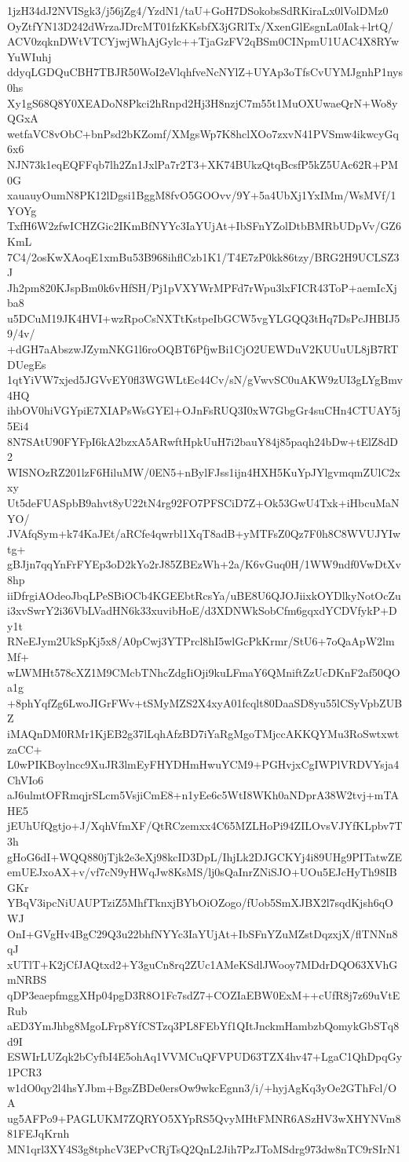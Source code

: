 1jzH34dJ2NVISgk3/j56jZg4/YzdN1/taU+GoH7DSokobsSdRKiraLx0lVolDMz0
OyZtfYN13D242dWrzaJDrcMT01fzKKsbfX3jGRlTx/XxenGlEsgnLa0Iak+lrtQ/
ACV0zqknDWtVTCYjwjWhAjGylc++TjaGzFV2qBSm0CINpmU1UAC4X8RYwYuWIuhj
ddyqLGDQuCBH7TBJR50WoI2eVlqhfveNcNYlZ+UYAp3oTfsCvUYMJgnhP1nys0hs
Xy1gS68Q8Y0XEADoN8Pkci2hRnpd2Hj3H8nzjC7m55t1MuOXUwaeQrN+Wo8yQGxA
wetfaVC8vObC+bnPsd2bKZomf/XMgsWp7K8hclXOo7zxvN41PVSmw4ikwcyGq6x6
NJN73k1eqEQFFqb7lh2Zn1JxlPa7r2T3+XK74BUkzQtqBcsfP5kZ5UAc62R+PM0G
xauauyOumN8PK12lDgsi1BggM8fvO5GOOvv/9Y+5a4UbXj1YxIMm/WsMVf/1YOYg
TxfH6W2zfwICHZGic2IKmBfNYYc3IaYUjAt+IbSFnYZolDtbBMRbUDpVv/GZ6KmL
7C4/2osKwXAoqE1xmBu53B968ihflCzb1K1/T4E7zP0kk86tzy/BRG2H9UCLSZ3J
Jh2pm820KJspBm0k6vHfSH/Pj1pVXYWrMPFd7rWpu3lxFICR43ToP+aemIcXjba8
u5DCuM19JK4HVI+wzRpoCsNXTtKstpeIbGCW5vgYLGQQ3tHq7DsPcJHBIJ59/4v/
+dGH7aAbszwJZymNKG1l6roOQBT6PfjwBi1CjO2UEWDuV2KUUuUL8jB7RTDUegEs
1qtYiVW7xjed5JGVvEY0fl3WGWLtEc44Cv/sN/gVwvSC0uAKW9zUI3gLYgBmv4HQ
ihbOV0hiVGYpiE7XIAPsWsGYEl+OJnFsRUQ3I0xW7GbgGr4suCHn4CTUAY5j5Ei4
8N7SAtU90FYFpI6kA2bzxA5ARwftHpkUuH7i2bauY84j85paqh24bDw+tElZ8dD2
WISNOzRZ201lzF6HiluMW/0EN5+nBylFJss1ijn4HXH5KuYpJYlgvmqmZUlC2xxy
Ut5deFUASpbB9ahvt8yU22tN4rg92FO7PFSCiD7Z+Ok53GwU4Txk+iHbcuMaNYO/
JVAfqSym+k74KaJEt/aRCfe4qwrbl1XqT8adB+yMTFsZ0Qz7F0h8C8WVUJYIwtg+
gBJjn7qqYnFrFYEp3oD2kYo2rJ85ZBEzWh+2a/K6vGuq0H/1WW9ndf0VwDtXv8hp
iiDfrgiAOdeoJbqLPeSBiOCb4KGEEbtRcsYa/uBE8U6QJOJiixkOYDlkyNotOcZu
i3xvSwrY2i36VbLVadHN6k33xuvibHoE/d3XDNWkSobCfm6gqxdYCDVfykP+Dy1t
RNeEJym2UkSpKj5x8/A0pCwj3YTPrcl8hI5wlGcPkKrmr/StU6+7oQaApW2lmMf+
wLWMHt578cXZ1M9CMcbTNhcZdgIiOji9kuLFmaY6QMniftZzUcDKnF2af50QOa1g
+8phYqfZg6LwoJIGrFWv+tSMyMZS2X4xyA01fcqlt80DaaSD8yu55lCSyVpbZUBZ
iMAQnDM0RMr1KjEB2g37lLqhAfzBD7iYaRgMgoTMjccAKKQYMu3RoSwtxwtzaCC+
L0wPIKBoylncc9XuJR3lmEyFHYDHmHwuYCM9+PGHvjxCgIWPlVRDVYsja4ChVIo6
aJ6ulmtOFRmqjrSLcm5VsjiCmE8+n1yEe6c5WtI8WKh0aNDprA38W2tvj+mTAHE5
jEUhUfQgtjo+J/XqhVfmXF/QtRCzemxx4C65MZLHoPi94ZILOvsVJYfKLpbv7T3h
gHoG6dI+WQQ880jTjk2e3eXj98kcID3DpL/IhjLk2DJGCKYj4i89UHg9PITatwZE
emUEJxoAX+v/vf7cN9yHWqJw8KsMS/lj0sQaInrZNiSJO+UOu5EJcHyTh98IBGKr
YBqV3ipcNiUAUPTziZ5MhfTknxjBYbOiOZogo/fUob5SmXJBX2l7sqdKjsh6qOWJ
OnI+GVgHv4BgC29Q3u22bhfNYYc3IaYUjAt+IbSFnYZuMZstDqzxjX/flTNNn8qJ
xUTlT+K2jCfJAQtxd2+Y3guCn8rq2ZUc1AMeKSdlJWooy7MDdrDQO63XVhGmNRBS
qDP3eaepfmggXHp04pgD3R8O1Fc7sdZ7+COZIaEBW0ExM++cUfR8j7z69uVtERub
aED3YmJhbg8MgoLFrp8YfCSTzq3PL8FEbYf1QItJnckmHambzbQomykGbSTq8d9I
ESWIrLUZqk2bCyfbI4E5ohAq1VVMCuQFVPUD63TZX4hv47+LgaC1QhDpqGy1PCR3
w1dO0qy2l4hsYJbm+BgsZBDe0ersOw9wkcEgnn3/i/+hyjAgKq3yOe2GThFcl/OA
ug5AFPo9+PAGLUKM7ZQRYO5XYpRS5QvyMHtFMNR6ASzHV3wXHYNVm881FEJqKrnh
MN1qrl3XY4S3g8tphcV3EPvCRjTsQ2QnL2Jih7PzJToMSdrg973dw8nTC9rSIrN1
